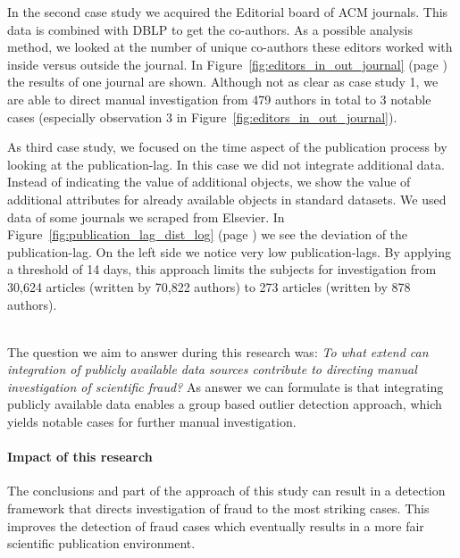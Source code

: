 \documentclass{ou-report}
\newcommand{\dblp}{DBLP}
\begin{document}
In the second case study we acquired the Editorial board of ACM journals. This 
data is combined with \dblp{} to get the co-authors. As a possible analysis 
method, we looked at the number of unique co-authors these editors worked with 
inside versus outside the journal. In Figure~\ref{fig:editors_in_out_journal} 
(page \pageref{fig:editors_in_out_journal}) the results of one journal are 
shown. Although not as clear as case study 1, we 
are able to direct manual investigation from 479 authors in total to 3 notable 
cases (especially observation 3 in Figure~\ref{fig:editors_in_out_journal}).

As third case study, we focused on the time aspect of the publication process by 
looking at the publication-lag. In this case we did not integrate additional 
data. Instead of indicating the value of additional objects, we show the value 
of additional attributes for already available objects in standard datasets. We 
used data of some journals we scraped from Elsevier. In 
Figure~\ref{fig:publication_lag_dist_log} (page 
\pageref{fig:publication_lag_dist_log}) we see the deviation of the
publication-lag. On the left side we notice very low publication-lags. 
By applying a threshold of 14 days, this approach limits the subjects for 
investigation from 30,624 articles (written by 70,822 authors) to 273 articles 
(written by 878 authors).

\ \\
The question we aim to answer during this research was: \emph{To what extend 
can integration of publicly available data sources contribute to directing 
manual investigation of scientific fraud?} As answer we can formulate is that 
integrating publicly available data enables a group based outlier detection 
approach, which yields notable cases for further manual investigation.

\paragraph{Impact of this research}
The conclusions and part of the approach of this study can result in a detection
framework that directs investigation of fraud to the most striking cases. This
improves the detection of fraud cases which eventually results in a more fair
scientific publication environment.
\end{document}

